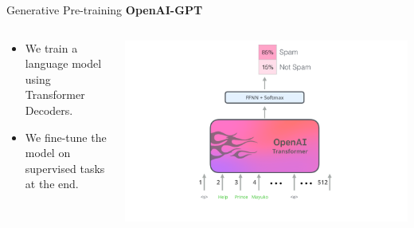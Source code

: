 \documentclass[aspectratio=169]{beamer}
\begin{document}
\begin{frame}{Generative Pre-training}
\centering
\textbf{OpenAI-GPT \cite{radford2018improving}}

\begin{columns}
\begin{column}{0.5\textwidth}
\begin{itemize}
	\item We train a language model using Transformer Decoders.
	\item We fine-tune the model on supervised tasks at the end.
\end{itemize}
   
\end{column}
\begin{column}{0.5\textwidth}  %
    \centering

\includegraphics[width=\textwidth]{figures/openai-transformer-sentence-classification}

\end{column}
\end{columns}
\end{frame}
\end{document}
